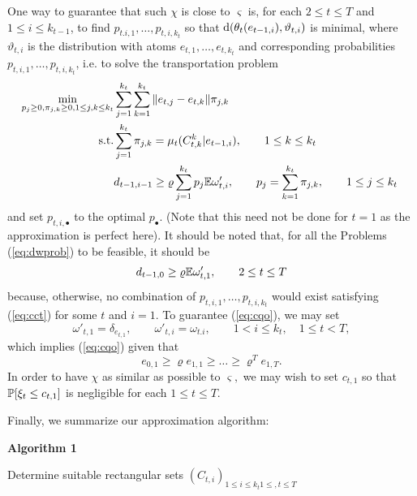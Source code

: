 \documentclass{article}              %
\begin{document}
One way to guarantee that such $\chi$ is close to $\varsigma$
is, for each $2\leq t \leq T$ and $1\leq i \leq k_{t-1}$, to find $p_{t.i,1},\dots,p_{t,i,k_{t}}$  so that $\dw(\theta_{t}(e_{t-1,i}),\vartheta_{t,i})$
is minimal, where $\vartheta_{t,i}$ is the distribution with atoms
$e_{t,1},\dots,e_{t,k_{t}}$ and corresponding probabilities $p_{t,i,1},\dots,p_{t,i,k_{t}}$,
i.e. to solve the transportation problem 
\begin{align}
\min_{p_{j}\geq0,\pi_{j,k}\geq0,1\leq j,k\leq k_{t}} & \sum_{j=1}^{k_{t}}\sum_{k=1}^{k_{t}}\|e_{t,j}-e_{t,k}\|\pi_{j,k}\label{eq:dwprob}\\
\text{s.t.} & \sum_{j=1}^{k_{t}}\pi_{j,k}=\mu_{t}(C_{t,k}^{k}|e_{t-1,i}),\qquad1\leq k\leq k_{t}\nonumber \\
 & d_{t-1,i-1}\geq\varrho\sum_{j=1}^{k_{t}}p_{j}\E\omega'_{t,i},\qquad p_{j}=\sum_{k=1}^{k_{t}}\pi_{j,k},\qquad1\leq j\leq k_{t}\text{ }\label{eq:cct}
\end{align}
and set $p_{t,i,\bullet}$ to the optimal $p_{\bullet}$. (Note that this need not be done for $t=1$ as the approximation is perfect here). It should
be noted that, for all the Problems (\ref{eq:dwprob}) to be feasible,
it should be 
\begin{equation}
d_{t-1,0}\geq\varrho\E\omega'_{t,1},\qquad2\leq t\leq T\label{eq:cqo}
\end{equation}
because, otherwise, no combination of $p_{t,i,1},\dots,p_{t,i,k_{t}}$
would exist satisfying (\ref{eq:cct}) for some $t$ and $i=1$. To
guarantee (\ref{eq:cqo}), we may set
\begin{equation}
\omega'{}_{t,1}=\delta_{e_{t,1}},\qquad \omega'{}_{t,i}=\omega_{t.i},\qquad1<i\leq k_{t},\quad 1\leq t<T,\label{eq:dee}
\end{equation}
which implies (\ref{eq:cqo}) given that 
\begin{equation}
e_{0,1}\geq\varrho e_{1,1}\geq\dots\geq\varrho^{T}e_{1,T}.\label{eq:eeeee}
\end{equation}
In order to have $\chi$ as similar as possible to $\varsigma,$ we
may wish to set $c_{t,1}$ so that $\P[\xi_{t}\leq c_{t,1}]$ is negligible
for each $1\leq t\leq T$.

Finally, we summarize our approximation algorithm:

\bigskip 

{\bf Algorithm 1}

\smallskip

Determine suitable rectangular sets $(C_{t,i})_{1\leq i\leq k_{t}1\leq,t\leq T}$ 
\end{document}
